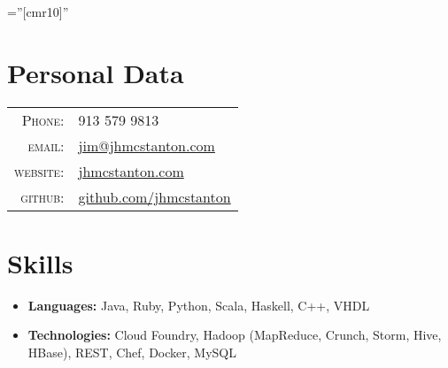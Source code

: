 \documentclass[10pt]{article} %
\begin{document}
\pagestyle{empty} %

\font\fb=''[cmr10]'' %


\par{\bigskip\par} %

\section{Personal Data}

\begin{table}[h]
\centering
\begin{tabular}{rl}
\textsc{Phone:} & 913 579 9813 \\
\textsc{email:} & \href{mailto:jim@jhmcstanton.com}{jim@jhmcstanton.com}\\
\textsc{website:} & \href{http://www.jhmcstanton.com}{jhmcstanton.com}\\
\textsc{github:} & \href{http://www.github.com/jhmcstanton}{github.com/jhmcstanton}
\end{tabular}
\end{table}


\section{Skills}

\begin{itemize}
\item \textbf{Languages:} Java, Ruby, Python, Scala, Haskell, C++, VHDL
\item \textbf{Technologies:} Cloud Foundry, Hadoop (MapReduce, Crunch, Storm, Hive, HBase), REST, Chef, Docker, MySQL
\end{itemize}
\end{document}
